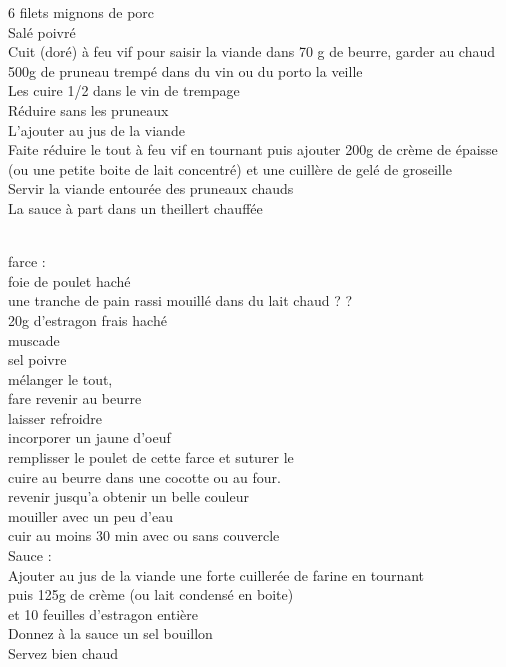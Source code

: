 \begin{minipage}[c]{\textwidth}
6 filets mignons de porc\\
Salé poivré\\
Cuit (doré) à feu vif pour saisir la viande dans 70 g de beurre, garder au chaud\\
500g de pruneau trempé dans du vin ou du porto la veille\\
Les cuire 1/2 dans le vin de trempage\\
Réduire sans les pruneaux\\
L’ajouter au jus de la viande\\
Faite réduire le tout à feu vif en tournant puis ajouter 200g de crème de épaisse (ou une petite boite de lait concentré) et une cuillère de gelé de groseille\\
Servir la viande entourée des pruneaux chauds\\
La sauce à part dans un theillert chauffée\\
\\

\end{minipage}

\begin{minipage}[c]{\textwidth}
farce :\\
    foie de poulet haché\\
    une tranche de pain rassi mouillé dans du lait chaud ? ?\\
    20g d'estragon frais haché\\
    muscade\\
    sel poivre\\
    mélanger le tout,\\
    fare revenir au beurre\\
    laisser refroidre\\
incorporer un jaune d'oeuf\\
remplisser le poulet de cette farce et suturer le\\
cuire au beurre dans une cocotte ou au four.\\
revenir jusqu'a obtenir un belle couleur\\
mouiller avec un peu d'eau\\
cuir au moins 30 min avec ou sans couvercle\\
Sauce :\\
    Ajouter au jus de la viande une forte cuillerée de farine en tournant\\
    puis 125g de crème (ou lait condensé en boite)\\
    et 10 feuilles d'estragon entière\\
    Donnez à la sauce un sel bouillon\\
    Servez bien chaud\\
\\

\end{minipage}

